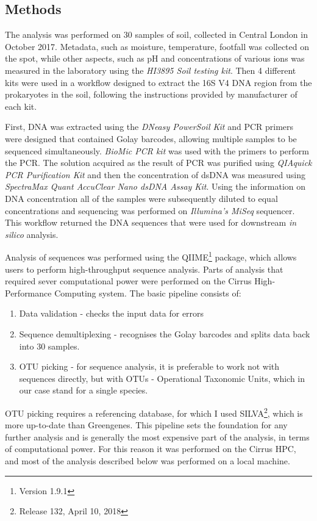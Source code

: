 \documentclass{article}
\begin{document}
\begin{multicols}{2}
\section{Methods}
The analysis was performed on 30 samples of soil, collected in Central London in October 2017. Metadata, such as moisture, temperature, footfall was collected on the spot, while other aspects, such as pH and concentrations of various ions was measured in the laboratory using the \textit{HI3895 Soil testing kit}. Then 4 different kits were used in a workflow designed to extract the 16S V4 DNA region from the prokaryotes in the soil, following the instructions provided by manufacturer of each kit.
\par
First, DNA was extracted using the \textit{DNeasy PowerSoil Kit} and PCR primers were designed that contained Golay barcodes, allowing multiple samples to be sequenced simultaneously. \textit{BioMic PCR kit} was used with the primers to perform the PCR. The solution acquired as the result of PCR was purified using \textit{QIAquick PCR Purification Kit} and then the concentration of dsDNA was measured using \textit{SpectraMax Quant AccuClear Nano dsDNA Assay Kit}. Using the information on DNA concentration all of the samples were subsequently diluted to equal concentrations and sequencing was performed on \textit{Illumina's MiSeq} sequencer. This workflow returned the DNA sequences that were used for downstream \textit{in silico} analysis.
\par
Analysis of sequences was performed using the QIIME\footnote{Version 1.9.1} package\cite{Caporaso2010,Kuczynski2012}, which allows users to perform high-throughput sequence analysis. Parts of analysis that required sever computational power were performed on the Cirrus High-Performance Computing system. The basic pipeline consists of:
\begin{enumerate}
	\item Data validation - checks the input data for errors
	\item Sequence demultiplexing - recognises the Golay barcodes and splits data back into 30 samples.
	\item OTU picking - for sequence analysis, it is preferable to work not with sequences directly, but with OTUs - Operational Taxonomic Units, which in our case stand for a single species.
\end{enumerate}
\par 
OTU picking requires a referencing database, for which I used SILVA\cite{Quast2012}\footnote{Release 132, April 10, 2018}, which is more up-to-date than Greengenes\cite{McDonald2012}. This pipeline sets the foundation for any further analysis and is generally the most expensive part of the analysis, in terms of computational power. For this reason it was performed on the Cirrus HPC, and most of the analysis described below was performed on a local machine. 

\end{multicols}
\end{document}
